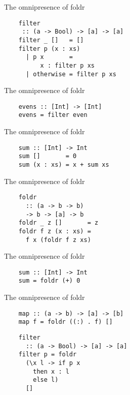 \documentclass[20pt]{beamer}
\begin{document}
\begin{frame}[fragile]{The omnipresence of foldr}
    \begin{lstlisting}
    filter
     :: (a -> Bool) -> [a] -> [a]
    filter _ []   = []
    filter p (x : xs)
      | p x       =
          x : filter p xs
      | otherwise = filter p xs
    \end{lstlisting}
\end{frame}

\begin{frame}[fragile]{The omnipresence of foldr}
    \begin{lstlisting}
    evens :: [Int] -> [Int]
    evens = filter even
    \end{lstlisting}
\end{frame}

\begin{frame}[fragile]{The omnipresence of foldr}
    \begin{lstlisting}
    sum :: [Int] -> Int
    sum []       = 0
    sum (x : xs) = x + sum xs
    \end{lstlisting}
\end{frame}

\begin{frame}[fragile]{The omnipresence of foldr}
    \begin{lstlisting}
    foldr
      :: (a -> b -> b)
      -> b -> [a] -> b
    foldr _ z []       = z
    foldr f z (x : xs) =
      f x (foldr f z xs)
    \end{lstlisting}
\end{frame}

\begin{frame}[fragile]{The omnipresence of foldr}
    \begin{lstlisting}
    sum :: [Int] -> Int
    sum = foldr (+) 0
    \end{lstlisting}
\end{frame}

\begin{frame}[fragile]{The omnipresence of foldr}
    \begin{lstlisting}
    map :: (a -> b) -> [a] -> [b]
    map f = foldr ((:) . f) []
    \end{lstlisting}

    \begin{lstlisting}
    filter
      :: (a -> Bool) -> [a] -> [a]
    filter p = foldr
      (\x l -> if p x
        then x : l
        else l)
      []
    \end{lstlisting}
\end{frame}
\end{document}

